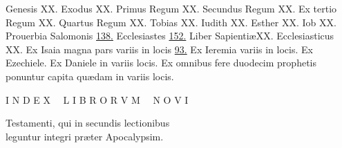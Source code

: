 \documentclass[a5paper,10pt]{book}
\def\ae{æ}
\begin{document}
\begin{multicols}{2}
\par \noindent Genesis \hfill XX.
\newline Exodus \hfill XX.
\newline Primus Regum \hfill XX.
\newline Secundus Regum \hfill XX.
\newline Ex tertio Regum \hfill XX.
\newline Quartus Regum \hfill XX.
\newline Tobias \hfill XX.
\newline Iudith \hfill XX.
\newline Esther \hfill XX.
\newline Iob \hfill XX.
\newline Prouerbia Salomonis \hfill \hyperlink{page.138}{138.}
\newline Ecclesiastes \hfill \hyperlink{page.152}{152.}
\newline Liber Sapienti\ae \hfill XX.
\newline Ecclesiasticus \hfill XX.
\newline Ex Isaia magna pars variis in
\newline \indent locis \hfill \hyperlink{page.93}{93.}
\newline Ex Ieremia variis in locis.
\newline Ex Ezechiele.
\newline Ex Daniele in variis locis.
\newline Ex omnibus fere duodecim
\newline \indent prophetis ponuntur capita
\newline \indent qu\ae dam in variis locis. %
\end{multicols}
\vspace{+1em}

\begin{center} \color{red} \Large
I N D E X \ \ L I B R O R V M \ \ N O V I
\end{center}
\vspace{-1.5em}

\begin{center} \large
Testamenti, qui in secundis lectionibus\\
leguntur integri pr\ae ter Apocalypsim.
\end{center}
\end{document}
